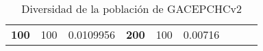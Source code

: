 \begin{table}[H]
\begin{tabular}{|ccrccrccc}
\multicolumn{1}{|c|}{\multirow{-39}{*}{\cellcolor[HTML]{FFFFC7}\textbf{100}}} & \multicolumn{1}{c|}{\multirow{-9}{*}{\cellcolor[HTML]{DDFDFF}100}} & \multicolumn{1}{r|}{\cellcolor[HTML]{DAE8FC}0.0109956}   & \multicolumn{1}{c|}{\multirow{-39}{*}{\cellcolor[HTML]{FFFFC7}\textbf{200}}} & \multicolumn{1}{c|}{\multirow{-10}{*}{\cellcolor[HTML]{DDFDFF}100}} & \multicolumn{1}{r|}{\cellcolor[HTML]{DDFDFF}0.00716}     &                                                                              &                                                                    &                                                          \\ \cline{1-6}
\end{tabular}
\caption{\label{res:GACEPv2_Diversity}Diversidad de la población de GACEPCHCv2}
\end{table}

